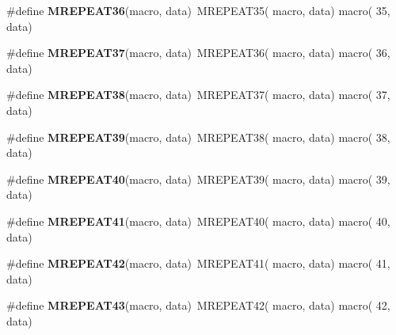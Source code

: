 \begin{DoxyCompactItemize}
\item 
\hypertarget{group__group__sam0__utils__mrepeat_gad01671ded2811e1cabe5d5642ebb4987}{}\#define {\bfseries M\+R\+E\+P\+E\+A\+T36}(macro,  data)~M\+R\+E\+P\+E\+A\+T35( macro, data)   macro( 35, data)\label{group__group__sam0__utils__mrepeat_gad01671ded2811e1cabe5d5642ebb4987}

\item 
\hypertarget{group__group__sam0__utils__mrepeat_ga82184cd9b81480efe7d23bb1bd035645}{}\#define {\bfseries M\+R\+E\+P\+E\+A\+T37}(macro,  data)~M\+R\+E\+P\+E\+A\+T36( macro, data)   macro( 36, data)\label{group__group__sam0__utils__mrepeat_ga82184cd9b81480efe7d23bb1bd035645}

\item 
\hypertarget{group__group__sam0__utils__mrepeat_ga809e564faa3a2869dbe184488e37a7b2}{}\#define {\bfseries M\+R\+E\+P\+E\+A\+T38}(macro,  data)~M\+R\+E\+P\+E\+A\+T37( macro, data)   macro( 37, data)\label{group__group__sam0__utils__mrepeat_ga809e564faa3a2869dbe184488e37a7b2}

\item 
\hypertarget{group__group__sam0__utils__mrepeat_ga8940da677b29febf21ca13b7c42d97a2}{}\#define {\bfseries M\+R\+E\+P\+E\+A\+T39}(macro,  data)~M\+R\+E\+P\+E\+A\+T38( macro, data)   macro( 38, data)\label{group__group__sam0__utils__mrepeat_ga8940da677b29febf21ca13b7c42d97a2}

\item 
\hypertarget{group__group__sam0__utils__mrepeat_ga38c6ce54b5de528a63b8cb4298e57493}{}\#define {\bfseries M\+R\+E\+P\+E\+A\+T40}(macro,  data)~M\+R\+E\+P\+E\+A\+T39( macro, data)   macro( 39, data)\label{group__group__sam0__utils__mrepeat_ga38c6ce54b5de528a63b8cb4298e57493}

\item 
\hypertarget{group__group__sam0__utils__mrepeat_ga1c029ee082fe728ca07ac8fb71fbe4d9}{}\#define {\bfseries M\+R\+E\+P\+E\+A\+T41}(macro,  data)~M\+R\+E\+P\+E\+A\+T40( macro, data)   macro( 40, data)\label{group__group__sam0__utils__mrepeat_ga1c029ee082fe728ca07ac8fb71fbe4d9}

\item 
\hypertarget{group__group__sam0__utils__mrepeat_gab6109bc5321c78307694174520c00217}{}\#define {\bfseries M\+R\+E\+P\+E\+A\+T42}(macro,  data)~M\+R\+E\+P\+E\+A\+T41( macro, data)   macro( 41, data)\label{group__group__sam0__utils__mrepeat_gab6109bc5321c78307694174520c00217}

\item 
\hypertarget{group__group__sam0__utils__mrepeat_ga1e33b119c4bd161e0262399c67ccc6c8}{}\#define {\bfseries M\+R\+E\+P\+E\+A\+T43}(macro,  data)~M\+R\+E\+P\+E\+A\+T42( macro, data)   macro( 42, data)\label{group__group__sam0__utils__mrepeat_ga1e33b119c4bd161e0262399c67ccc6c8}


\end{DoxyCompactItemize}
